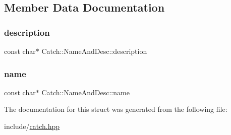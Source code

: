 \subsection{Member Data Documentation}
\mbox{\label{struct_catch_1_1_name_and_desc_a3463a23ff65ce494fc380452b57b7970}} 
\subsubsection{\texorpdfstring{description}{description}}
{\footnotesize\ttfamily const char$\ast$ Catch\+::\+Name\+And\+Desc\+::description}

\mbox{\label{struct_catch_1_1_name_and_desc_a374b4ed8be3cf98be20ebde5273bde51}} 
\subsubsection{\texorpdfstring{name}{name}}
{\footnotesize\ttfamily const char$\ast$ Catch\+::\+Name\+And\+Desc\+::name}



The documentation for this struct was generated from the following file\+:\begin{DoxyCompactItemize}
\item 
include/\mbox{\hyperlink{catch_8hpp}{catch.\+hpp}}\end{DoxyCompactItemize}
